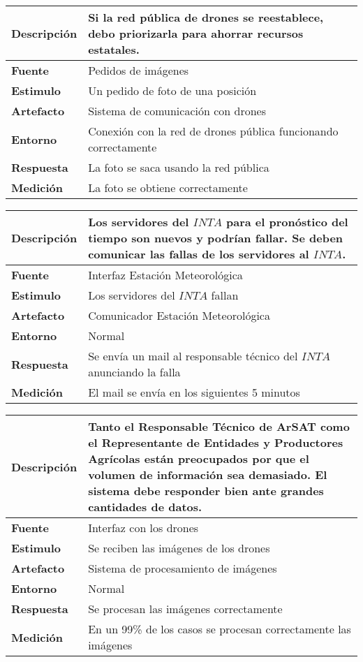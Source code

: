 \begin{tabular}{| l || p{12cm} |}
\hline 
\textbf{Descripci\'on} & Si la red pública de drones se reestablece, debo priorizarla para ahorrar recursos estatales. \\
\hline 
\textbf{Fuente} & Pedidos de imágenes \\
\hline 
\textbf{Estimulo} & Un pedido de foto de una posición \\
\hline 
\textbf{Artefacto} & Sistema de comunicación con drones \\
\hline 
\textbf{Entorno} & Conexión con la red de drones pública funcionando correctamente \\
\hline 
\textbf{Respuesta} & La foto se saca usando la red pública \\
\hline 
\textbf{Medici\'on} & La foto se obtiene correctamente \\
\hline 
\end{tabular}

\medskip

\begin{tabular}{| l || p{12cm} |}
\hline 
\textbf{Descripci\'on} & Los servidores del $INTA$ para el pronóstico del tiempo son nuevos y podr\'ian fallar. Se deben comunicar las fallas de los servidores al $INTA$. \\
\hline 
\textbf{Fuente} & Interfaz Estación Meteorológica\\
\hline 
\textbf{Estimulo} & Los servidores del $INTA$ fallan\\
\hline 
\textbf{Artefacto} & Comunicador Estación Meteorológica \\
\hline 
\textbf{Entorno} & Normal \\
\hline 
\textbf{Respuesta} & Se envía un mail al responsable técnico del $INTA$ anunciando la falla \\
\hline 
\textbf{Medici\'on} & El mail se envía en los siguientes 5 minutos \\
\hline 
\end{tabular}

\medskip

\begin{tabular}{| l || p{12cm} |}
\hline 
\textbf{Descripci\'on} & Tanto el Responsable T\'ecnico de ArSAT como el Representante de Entidades y Productores Agr\'icolas están preocupados por que el volumen de informaci\'on sea demasiado. El sistema debe responder bien ante grandes cantidades de datos. \\
\hline 
\textbf{Fuente} & Interfaz con los drones \\
\hline 
\textbf{Estimulo} & Se reciben las imágenes de los drones \\
\hline 
\textbf{Artefacto} & Sistema de procesamiento de imágenes \\
\hline 
\textbf{Entorno} & Normal \\
\hline 
\textbf{Respuesta} & Se procesan las imágenes correctamente \\
\hline 
\textbf{Medici\'on} & En un 99\% de los casos se procesan correctamente las imágenes \\
\hline 
\end{tabular}

